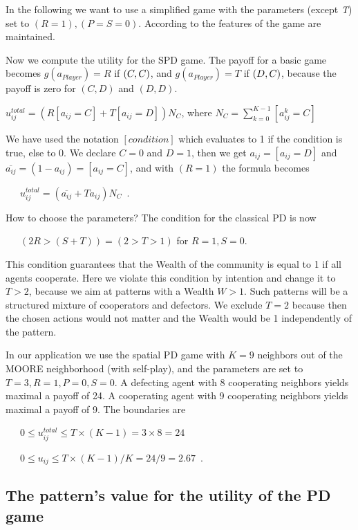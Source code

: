 \documentclass[10pt,a4paper]{article}  %
\begin{document}
In the following we want to use a simplified game %
with the parameters (except \textit{T}) set to $(R=1), (P=S=0)$.
According to 
\cite{Nowak1993} 
the features of the game are maintained.


Now we compute the utility for the SPD game.
The payoff for a basic game  becomes $g(a_{Player})=R$  if $\COMMENT{(a_{Player},a_{Opponent})=} (C,C)$,
and $g(a_{Player})=T$ if $\COMMENT{(a_{Player},a_{Opponent})=} (D,C)$,
because the payoff is zero for $(C,D)$ and $(D,D)$.

$u^{total}_{ij} = ( R[a_{ij}=C] + T[a_{ij}=D] )N_C$, where $N_C= \sum_{k=0}^{K-1} [a^{k}_{ij}=C]$ 


We have used the notation $[condition]$ which evaluates to 1 if the condition is true, else to 0.
We declare $C=0$ and $D=1$, then we get $a_{ij}=[a_{ij}=D]$ and $\overline{a_{ij}}=(1-a_{ij})=[a_{ij}=C]$, 
and with $(R=1)$ the formula becomes

~~~$u^{total}_{ij} = (\overline{a_{ij}}+ Ta_{ij})N_C$~.

How to choose the parameters?
The condition for the classical PD is now 

~~~$(2R > (S+T)) = (2 > T > 1)$ for $R=1,S=0$.

This condition guarantees that the Wealth of the community is equal to 1 if all agents cooperate. 
Here we violate this condition by intention and change it to  $T>2$, because we aim at patterns with a Wealth $W>1$.
Such patterns will be a structured mixture of cooperators and defectors.
We exclude $T=2$ because then the chosen actions would not matter and 
the Wealth would be 1 independently of the pattern. 

  In our application we use the spatial PD game with  $K=9$ neighbors
  out of the MOORE neighborhood (with self-play), and the parameters are set to
  $T=3, R=1, P=0, S=0$.
  A defecting agent with 8 cooperating neighbors yields maximal a payoff of 24.
  A cooperating agent with 9 cooperating neighbors yields maximal a payoff of 9.
  The boundaries are  
  
  ~~~$0 \leq u^{total}_{ij} \leq T \times (K-1) = 3 \times 8 = 24$ 
  
  ~~~$0 \leq u_{ij} \leq  T \times (K-1)/K = 24/9=2.67$~. 



\subsection{The pattern's value for the utility of the PD game}
\end{document}
